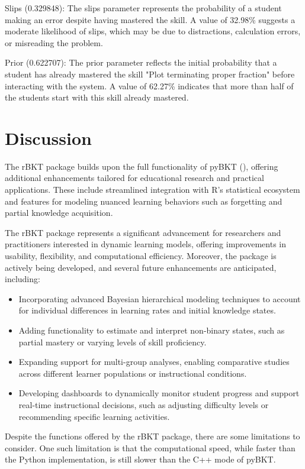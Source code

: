 \documentclass{article}
\begin{document}
Slips (0.329848): The slips parameter represents the probability of a student making an error despite having mastered the skill. A value of 32.98\% suggests a moderate likelihood of slips, which may be due to distractions, calculation errors, or misreading the problem.

Prior (0.622707): The prior parameter reflects the initial probability that a student has already mastered the skill "Plot terminating proper fraction" before interacting with the system. A value of 62.27\% indicates that more than half of the students start with this skill already mastered.

\section{Discussion}
The rBKT package builds upon the full functionality of pyBKT (\cite{badrinath2021pybkt}), offering additional enhancements tailored for educational research and practical applications. These include streamlined integration with R's statistical ecosystem and features for modeling nuanced learning behaviors such as forgetting and partial knowledge acquisition.

The rBKT package represents a significant advancement for researchers and practitioners interested in dynamic learning models, offering improvements in usability, flexibility, and computational efficiency. Moreover, the package is actively being developed, and several future enhancements are anticipated, including:

\begin{itemize}
\item Incorporating advanced Bayesian hierarchical modeling techniques to account for individual differences in learning rates and initial knowledge states.
\item Adding functionality to estimate and interpret non-binary states, such as partial mastery or varying levels of skill proficiency.
\item Expanding support for multi-group analyses, enabling comparative studies across different learner populations or instructional conditions.
\item Developing dashboards to dynamically monitor student progress and support real-time instructional decisions, such as adjusting difficulty levels or recommending specific learning activities.
\end{itemize}

Despite the functions offered by the rBKT package, there are some limitations to consider. One such limitation is that the computational speed, while faster than the Python implementation, is still slower than the C++ mode of pyBKT. 

\printbibliography
\end{document}
